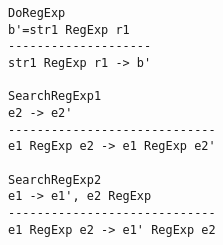 \documentclass[12pt,letterpaper]{article}
\begin{document}
\begin{enumerate}
\begin{enumerate}
\begin{verbatim}
DoRegExp
b'=str1 RegExp r1
--------------------
str1 RegExp r1 -> b'

SearchRegExp1
e2 -> e2'
-----------------------------
e1 RegExp e2 -> e1 RegExp e2'

SearchRegExp2
e1 -> e1', e2 RegExp
-----------------------------
e1 RegExp e2 -> e1' RegExp e2



\end{verbatim}
\end{enumerate}

\end{enumerate}
\end{document}
